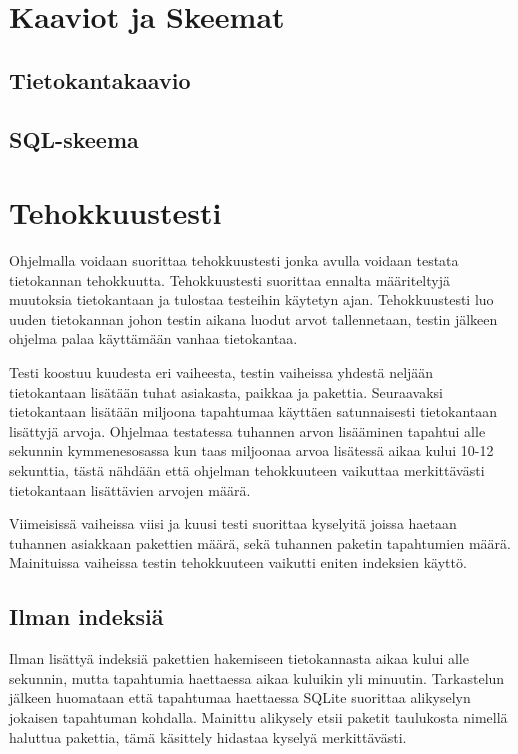 \documentclass[11pt,a4paper]{article}
\begin{document}
\newpage
\section{Kaaviot ja Skeemat}
\subsection*{Tietokantakaavio}

\subsection*{SQL-skeema}

\newpage
\section{Tehokkuustesti}
Ohjelmalla voidaan suorittaa tehokkuustesti jonka avulla voidaan testata tietokannan tehokkuutta. Tehokkuustesti suorittaa ennalta määriteltyjä muutoksia tietokantaan ja tulostaa testeihin käytetyn ajan. Tehokkuustesti luo uuden tietokannan johon testin aikana luodut arvot tallennetaan, testin jälkeen ohjelma palaa käyttämään vanhaa tietokantaa.

Testi koostuu kuudesta eri vaiheesta, testin vaiheissa yhdestä neljään tietokantaan lisätään tuhat asiakasta, paikkaa ja pakettia. Seuraavaksi tietokantaan lisätään miljoona tapahtumaa käyttäen satunnaisesti tietokantaan lisättyjä arvoja. Ohjelmaa testatessa tuhannen arvon lisääminen tapahtui alle sekunnin kymmenesosassa kun taas miljoonaa arvoa lisätessä aikaa kului 10-12 sekunttia, tästä nähdään että ohjelman tehokkuuteen vaikuttaa merkittävästi tietokantaan lisättävien arvojen määrä.

Viimeisissä vaiheissa viisi ja kuusi testi suorittaa kyselyitä joissa haetaan tuhannen asiakkaan pakettien määrä, sekä tuhannen paketin tapahtumien määrä. Mainituissa vaiheissa testin tehokkuuteen vaikutti eniten indeksien käyttö.

\subsection*{Ilman indeksiä}
Ilman lisättyä indeksiä pakettien hakemiseen tietokannasta aikaa kului alle sekunnin, mutta tapahtumia haettaessa aikaa kuluikin yli minuutin. Tarkastelun jälkeen huomataan että tapahtumaa haettaessa SQLite suorittaa alikyselyn jokaisen tapahtuman kohdalla. Mainittu alikysely etsii paketit taulukosta nimellä haluttua pakettia, tämä käsittely hidastaa kyselyä merkittävästi.
\end{document}
